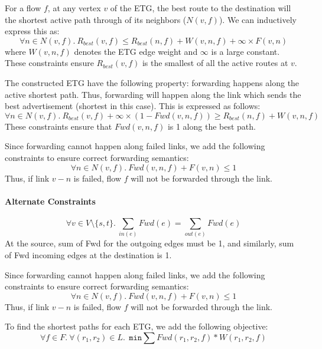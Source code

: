 \documentclass[]{article}
\begin{document}
For a flow $f$, at any vertex $v$ of the ETG, the best route to the
destination will the shortest active path through of its neighbors ($N(v,f)$).
We can inductively express this as: 
\begin{equation}
	\forall n \in N(v,f).~ R_{best}(v, f) \leq R_{best} (n, f) + W(v, n, f) + \infty \times F(v,n) 
\end{equation}
where $W(v,n,f)$ denotes the ETG edge weight and $\infty$ is a large constant. These
constraints ensure $R_{best}(v, f)$ is the smallest of all the active routes at $v$.

The constructed ETG have the following property: forwarding happens along the
active shortest path. Thus, forwarding will happen along the link which sends
the best advertisement (shortest in this case). This is expressed as follows:
\begin{equation}
	\forall n \in N(v,f). ~R_{best}(v,f) + \infty \times (1 - Fwd(v,n,f)) \geq R_{best} (n, f) + W(v, n, f)
\end{equation}
These constraints ensure that $Fwd(v,n,f)$ is 1 along the best path.

Since forwarding cannot happen along failed links, we add the following 
constraints to ensure correct forwarding semantics:
\begin{equation}
\forall n \in N(v,f).~Fwd(v,n,f) + F(v,n) \leq 1 
\end{equation}
Thus, if link $v-n$ is failed, flow $f$ will not be forwarded through the link.

\noindent\paragraph{Alternate Constraints}
\begin{equation}
	\forall v \in V \setminus \{s,t\}.~\sum_{in(e)} Fwd(e) = \sum_{out(e)} Fwd(e)
\end{equation}
At  the source, sum of Fwd for the outgoing edges must be 1, 
and similarly, sum of Fwd 
incoming edges at the destination is 1.

Since forwarding cannot happen along failed links, we add the following 
constraints to ensure correct forwarding semantics:
\begin{equation}
\forall n \in N(v,f).~Fwd(v,n,f) + F(v,n) \leq 1 
\end{equation}
Thus, if link $v-n$ is failed, flow $f$ will not be forwarded through the link.

To find the shortest paths for each ETG, we add the following 
objective:
\begin{equation}
\forall f \in F. ~\forall (r_1, r_2) \in L. ~~\texttt{min} \sum Fwd(r_1, r_2, f) * W(r_1, r_2, f)
\end{equation}
\end{document}
